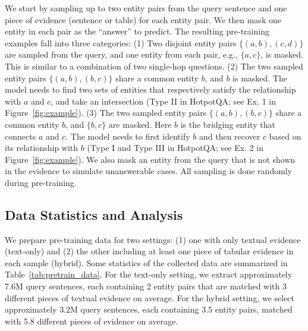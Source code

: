 \documentclass[11pt]{article}
\newcommand{\add}[1]{\textcolor{red}{#1}}
\newcommand{\revise}[1]{#1}
\newcommand{\nop}[1]{}
\begin{document}
We start by sampling up to two entity pairs from the query sentence and one piece of evidence\nop{sample} (sentence or table) for each entity pair. We then mask one entity in each pair as the ``answer'' to predict. {The resulting pre-training examples fall into three categories: (1) Two disjoint entity pairs $\{(a,b), (c,d)\}$ are sampled from the query, and one entity from each pair, e.g., $\{a, c\}$, is masked. This is similar to a combination of two single-hop questions. (2) The two sampled entity pairs $\{(a,b),(b,c)\}$ share a common entity $b$, and $b$ is masked. The model needs to find two sets of entities that respectively satisfy the relationship with $a$ and $c$, and take an intersection (Type II in HotpotQA; see Ex. 1 in Figure~\ref{fig:example}). (3) The two sampled entity pairs $\{(a,b),(b,c)\}$ share a common entity $b$, and $\{b,c\}$ are masked. Here $b$ is the bridging entity that connects $a$ and $c$. The model needs to first identify $b$ and then recover $c$ based on its relationship with $b$ (Type I and Type III in HotpotQA; see Ex. 2 in Figure~\ref{fig:example}).}\nop{Note that the selected entity pairs may contain overlapping entities, so the same entity may be selected as the ``answer'', or both entities in a pair may be masked. This naturally imitates different reasoning types in multi-hop QA, like finding the answer that satisfies multiple constraints {\add{(masking the same entity, see the second example in Figure 1)}}, or finding the answer through a bridging entity {\add{(masking both entities in a pair, see the third example in Figure 1)}}.} We also mask an entity from the query that is not shown in the evidence to simulate unanswerable cases. All sampling is done randomly during pre-training. \nop{just confirm that we don't first prepare the data `before' pre-training, right? Yes} \nop{I think this subsection needs to be significantly expanded. It's where \textit{reasoning} comes from and the design is not very intuitive. For example, it's probably not immediately clear to most audience why you'd need to select two entity pairs. You keep saying ``mimicking different reasoning types'', and this should be the place to elaborate on that.}

\subsection{Data Statistics and Analysis}
\revise{We prepare pre-training data for two settings: (1) one with only textual evidence (text-only) and (2) the other including at least one piece of tabular evidence in each sample (hybrid). Some statistics of the collected data are summarized in Table~\ref{tab:pretrain_data}. For the text-only setting, we extract approximately 7.6M query sentences, each containing 2 entity pairs that are matched with 3 different pieces of textual evidence on average.\nop{how many training instances do we have for each setting? 7.6M * 3?, the unique combinations should be more than that, but we consider going over all 7.6M queries as 1 epoch.} For the hybrid setting, we select approximately 3.2M query sentences, each containing 3.5 entity pairs, matched with 5.8 different pieces of evidence on average.}  \nop{we will have 2 pre-trained models respectively for the 2 settings, right?}
\end{document}
